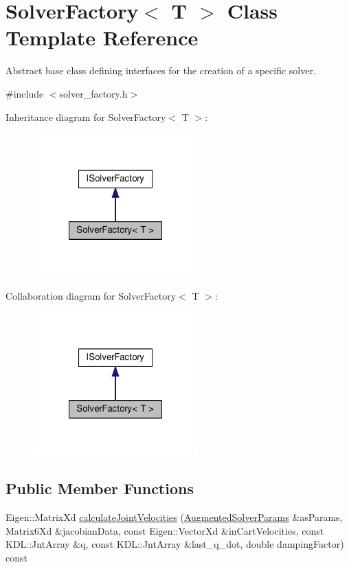 \hypertarget{classSolverFactory}{\section{Solver\-Factory$<$ T $>$ Class Template Reference}
\label{classSolverFactory}
}


Abstract base class defining interfaces for the creation of a specific solver.  




{\ttfamily \#include $<$solver\-\_\-factory.\-h$>$}



Inheritance diagram for Solver\-Factory$<$ T $>$\-:
\nopagebreak
\begin{figure}[H]
\begin{center}
\leavevmode
\includegraphics[width=180pt]{classSolverFactory__inherit__graph}
\end{center}
\end{figure}


Collaboration diagram for Solver\-Factory$<$ T $>$\-:
\nopagebreak
\begin{figure}[H]
\begin{center}
\leavevmode
\includegraphics[width=180pt]{classSolverFactory__coll__graph}
\end{center}
\end{figure}
\subsection*{Public Member Functions}
\begin{DoxyCompactItemize}
\item 
Eigen\-::\-Matrix\-Xd \hyperlink{classSolverFactory_a1dfa247805c6c9ec5a0adf36a710366d}{calculate\-Joint\-Velocities} (\hyperlink{structAugmentedSolverParams}{Augmented\-Solver\-Params} \&as\-Params, Matrix6\-Xd \&jacobian\-Data, const Eigen\-::\-Vector\-Xd \&in\-Cart\-Velocities, const K\-D\-L\-::\-Jnt\-Array \&q, const K\-D\-L\-::\-Jnt\-Array \&last\-\_\-q\-\_\-dot, double damping\-Factor) const 
\end{DoxyCompactItemize}
